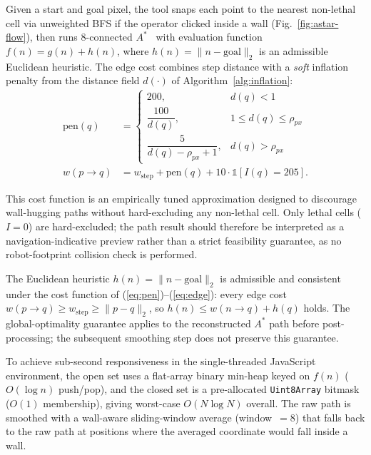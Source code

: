 \documentclass[journal]{IEEEtran}
\begin{document}
Given a start and goal pixel, the tool snaps each point to the nearest
non-lethal cell via unweighted BFS if the operator clicked inside a wall
(Fig.~\ref{fig:astar-flow}), then runs 8-connected
$A^{*}$~\cite{hart1968formal} with evaluation function
$f(n)=g(n)+h(n)$, where $h(n)=\|n-\text{goal}\|_2$ is an admissible Euclidean
heuristic.  The edge cost combines step distance with a \emph{soft} inflation
penalty from the distance field $d(\cdot)$ of Algorithm~\ref{alg:inflation}:
\begin{align}
\text{pen}(q) &= \begin{cases}
200, & d(q)<1\\[2pt]
\dfrac{100}{d(q)}, & 1\leq d(q)\leq\rho_{px}\\[4pt]
\dfrac{5}{d(q)-\rho_{px}+1}, & d(q)>\rho_{px}
\end{cases} \label{eq:pen}\\[4pt]
w(p\!\rightarrow\!q) &= w_{\text{step}} + \text{pen}(q)
                        + 10\cdot\mathbb{1}[I(q)=205]. \label{eq:edge}
\end{align}

This cost function is an empirically tuned approximation designed to discourage
wall-hugging paths without hard-excluding any non-lethal cell.  Only lethal
cells ($I=0$) are hard-excluded; the path result should therefore be
interpreted as a navigation-indicative preview rather than a strict feasibility
guarantee, as no robot-footprint collision check is performed.

The Euclidean heuristic $h(n)=\|n-\text{goal}\|_2$ is admissible and
consistent under the cost function of (\ref{eq:pen})--(\ref{eq:edge}): every
edge cost $w(p\!\rightarrow\!q)\geq w_{\text{step}}\geq\|p-q\|_2$, so
$h(n)\leq w(n\!\rightarrow\!q)+h(q)$ holds.  The global-optimality guarantee
applies to the reconstructed $A^{*}$ path before post-processing; the
subsequent smoothing step does not preserve this guarantee.

To achieve sub-second responsiveness in the single-threaded JavaScript
environment, the open set uses a flat-array binary min-heap keyed on $f(n)$
($O(\log n)$ push/pop), and the closed set is a pre-allocated
\texttt{Uint8Array} bitmask ($O(1)$ membership), giving worst-case
$O(N\log N)$ overall.  The raw path is smoothed with a wall-aware
sliding-window average (window~$=8$) that falls back to the raw path at
positions where the averaged coordinate would fall inside a wall.
\end{document}
